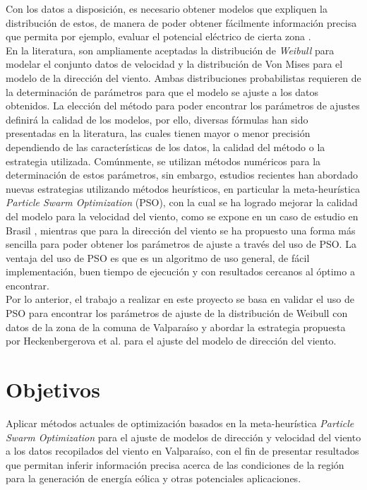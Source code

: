 Con los datos a disposición, es necesario obtener modelos que expliquen la distribución de estos, de manera de poder obtener fácilmente información
precisa que permita por ejemplo, evaluar el potencial eléctrico de cierta zona \cite{Dabbaghiyan15}. \\ 
En la literatura, son ampliamente aceptadas la distribución de \emph{Weibull} para modelar el conjunto datos de velocidad y la distribución de Von Mises para el modelo de la dirección del viento. Ambas distribuciones probabilistas requieren de la determinación de parámetros para que el modelo se ajuste a los datos obtenidos. La elección del método para poder encontrar los parámetros de ajustes definirá la calidad de los modelos, por ello, diversas fórmulas han sido presentadas en la literatura, las cuales tienen mayor o menor precisión dependiendo de las características de los datos, la calidad del método o la estrategia utilizada. Comúnmente, se utilizan métodos numéricos para la determinación de estos parámetros, sin embargo, estudios recientes han abordado nuevas estrategias
utilizando métodos heurísticos, en particular la meta-heurística \emph{Particle Swarm Optimization} (PSO), con la cual se ha logrado mejorar la calidad del modelo para la velocidad del viento, como se expone en un caso de estudio en Brasil  \cite{Carneiro15}, mientras que para la dirección del viento se ha propuesto una forma más sencilla para poder obtener los parámetros de ajuste a través del uso de PSO. La ventaja del uso de PSO es que es un algoritmo de uso general, de fácil implementación, buen tiempo de ejecución y con resultados cercanos al óptimo a encontrar.\\
Por lo anterior, el trabajo a realizar en este proyecto se basa en validar el uso de PSO para encontrar los parámetros de ajuste de la distribución de Weibull con datos de la zona de la comuna de Valparaíso y abordar la estrategia propuesta por Heckenbergerova et al.\cite{Heckenbergerova15} para el ajuste del modelo de dirección del viento.

\section{Objetivos}
Aplicar métodos actuales de optimización basados en la meta-heurística \emph{Particle Swarm Optimization} para el ajuste de modelos de dirección y velocidad del viento a los datos recopilados del viento en Valparaíso, con el fin de presentar resultados que permitan inferir información precisa acerca de las condiciones de la región para la generación de energía eólica y otras potenciales aplicaciones.

